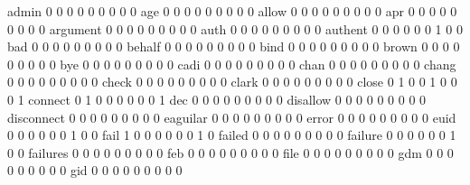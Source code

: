\documentclass[compress,8pt]{beamer}
\begin{document}
\begin{frame}
\begin{Schunk}
  admin                                      0   0   0   0   0   0   0   0   0
  age                                        0   0   0   0   0   0   0   0   0
  allow                                      0   0   0   0   0   0   0   0   0
  apr                                        0   0   0   0   0   0   0   0   0
  argument                                   0   0   0   0   0   0   0   0   0
  auth                                       0   0   0   0   0   0   0   0   0
  authent                                    0   0   0   0   0   0   1   0   0
  bad                                        0   0   0   0   0   0   0   0   0
  behalf                                     0   0   0   0   0   0   0   0   0
  bind                                       0   0   0   0   0   0   0   0   0
  brown                                      0   0   0   0   0   0   0   0   0
  bye                                        0   0   0   0   0   0   0   0   0
  cadi                                       0   0   0   0   0   0   0   0   0
  chan                                       0   0   0   0   0   0   0   0   0
  chang                                      0   0   0   0   0   0   0   0   0
  check                                      0   0   0   0   0   0   0   0   0
  clark                                      0   0   0   0   0   0   0   0   0
  close                                      0   1   0   0   1   0   0   0   1
  connect                                    0   1   0   0   0   0   0   0   1
  dec                                        0   0   0   0   0   0   0   0   0
  disallow                                   0   0   0   0   0   0   0   0   0
  disconnect                                 0   0   0   0   0   0   0   0   0
  eaguilar                                   0   0   0   0   0   0   0   0   0
  error                                      0   0   0   0   0   0   0   0   0
  euid                                       0   0   0   0   0   0   1   0   0
  fail                                       1   0   0   0   0   0   0   1   0
  failed                                     0   0   0   0   0   0   0   0   0
  failure                                    0   0   0   0   0   0   1   0   0
  failures                                   0   0   0   0   0   0   0   0   0
  feb                                        0   0   0   0   0   0   0   0   0
  file                                       0   0   0   0   0   0   0   0   0
  gdm                                        0   0   0   0   0   0   0   0   0
  gid                                        0   0   0   0   0   0   0   0   0

\end{Schunk}
\end{frame}
\end{document}
